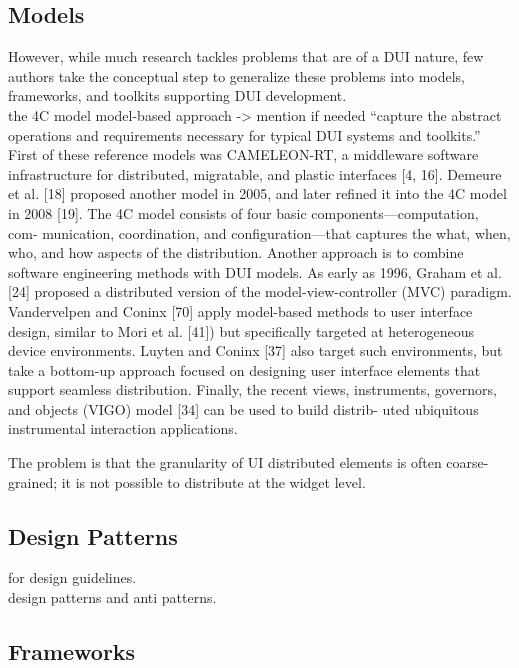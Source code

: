 \subsection{Models}
\cite{elmqvist2011distributed}However, while much research tackles problems
that are of a DUI nature, few authors take the conceptual step to generalize these problems into models,
frameworks, and toolkits supporting DUI development. \\
\cite{demeure20084c} the 4C model
\cite{melchior2011distributed} model-based approach -> mention if needed
\cite{elmqvist2011distributed} ``capture the abstract operations and 
requirements necessary for typical DUI systems and toolkits.'' \\
\cite{elmqvist2011distributed} First of these reference models was CAMELEON-RT,
a middleware software infrastructure for distributed, migratable, and plastic interfaces [4, 16]. Demeure et al. [18] proposed another model in 2005, and later refined it into the 4C model in 2008 [19]. The 4C model consists of four basic components—computation, com- munication, coordination, and configuration—that captures the what, when, who, and how aspects of the distribution.
Another approach is to combine software engineering methods with DUI models. As early as 1996, Graham et al. [24] proposed a distributed version of the model-view-controller (MVC) paradigm. Vandervelpen and Coninx [70] apply model-based methods to user interface design, similar to Mori et al. [41]) but specifically targeted at heterogeneous device environments. Luyten and Coninx [37] also target such environments, but take a bottom-up approach focused on designing user interface elements that support seamless distribution. Finally, the recent views, instruments, governors, and objects (VIGO) model [34] can be used to build distrib- uted ubiquitous instrumental interaction applications.

\cite{melchior2011distribution}The problem is that the granularity of UI
distributed elements is often coarse-grained; it is not possible to distribute
at the widget level.\\

\subsection{Design Patterns}
\cite{vanderdonckt2010distributed} for design guidelines.\\
\cite{seifried2011lessons} design patterns and anti patterns.

\subsection{Frameworks}

